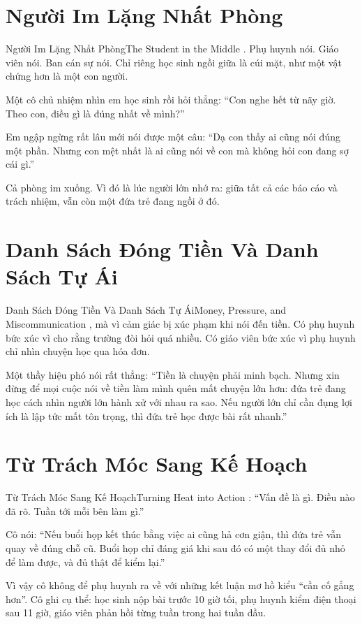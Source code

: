 \section{Người Im Lặng Nhất Phòng}
\begin{truyen}{Người Im Lặng Nhất Phòng}{The Student in the Middle}
. Phụ huynh nói. Giáo viên nói. Ban cán sự nói. Chỉ riêng học sinh ngồi giữa là cúi mặt, như một vật chứng hơn là một con người.

Một cô chủ nhiệm nhìn em học sinh rồi hỏi thẳng: ``Con nghe hết từ nãy giờ. Theo con, điều gì là đúng nhất về mình?''

Em ngập ngừng rất lâu mới nói được một câu: ``Dạ con thấy ai cũng nói đúng một phần. Nhưng con mệt nhất là ai cũng nói về con mà không hỏi con đang sợ cái gì.''

Cả phòng im xuống. Vì đó là lúc người lớn nhớ ra: giữa tất cả các báo cáo và trách nhiệm, vẫn còn một đứa trẻ đang ngồi ở đó.
\end{truyen}

\section{Danh Sách Đóng Tiền Và Danh Sách Tự Ái}
\begin{truyen}{Danh Sách Đóng Tiền Và Danh Sách Tự Ái}{Money, Pressure, and Miscommunication}
, mà vì cảm giác bị xúc phạm khi nói đến tiền. Có phụ huynh bức xúc vì cho rằng trường đòi hỏi quá nhiều. Có giáo viên bức xúc vì phụ huynh chỉ nhìn chuyện học qua hóa đơn.

Một thầy hiệu phó nói rất thẳng: ``Tiền là chuyện phải minh bạch. Nhưng xin đừng để mọi cuộc nói về tiền làm mình quên mất chuyện lớn hơn: đứa trẻ đang học cách nhìn người lớn hành xử với nhau ra sao. Nếu người lớn chỉ cần đụng lợi ích là lập tức mất tôn trọng, thì đứa trẻ học được bài rất nhanh.''
\end{truyen}

\section{Từ Trách Móc Sang Kế Hoạch}
\begin{truyen}{Từ Trách Móc Sang Kế Hoạch}{Turning Heat into Action}
: ``Vấn đề là gì. Điều nào đã rõ. Tuần tới mỗi bên làm gì.''

Cô nói: ``Nếu buổi họp kết thúc bằng việc ai cũng hả cơn giận, thì đứa trẻ vẫn quay về đúng chỗ cũ. Buổi họp chỉ đáng giá khi sau đó có một thay đổi đủ nhỏ để làm được, và đủ thật để kiểm lại.''

Vì vậy cô không để phụ huynh ra về với những kết luận mơ hồ kiểu ``cần cố gắng hơn''. Cô ghi cụ thể: học sinh nộp bài trước 10 giờ tối, phụ huynh kiểm điện thoại sau 11 giờ, giáo viên phản hồi từng tuần trong hai tuần đầu.
\end{truyen}

